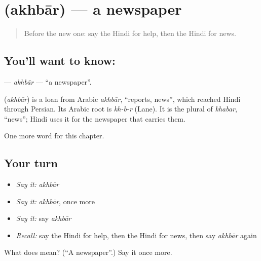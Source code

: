 \section[\texorpdfstring{\hi{अख़बार} (akhbār)}{अख़बार (akhbār)}]{ (akhbār) — a newspaper}

\label{lesson:HI-C190-akhbar}



\begin{quote}
Before the new one: say the Hindi for help, then the Hindi for news.
\end{quote}

\subsection*{You'll want to know: }
\textbf{} — \emph{akhbār} — \textquotedblleft{}a newspaper\textquotedblright{}.

\begin{cousinweb}
\textbf{} (\emph{akhbār}) is a loan from Arabic \emph{akhbār}, \textquotedblleft{}reports, news\textquotedblright{}, which reached Hindi through Persian. Its Arabic root is \emph{kh-b-r} (Lane). It is the plural of \emph{khabar}, \textquotedblleft{}news\textquotedblright{}; Hindi uses it for the newspaper that carries them.
\end{cousinweb}

\begin{grammarlens}[title={What you've built}]
One more word for this chapter.
\end{grammarlens}

\subsection*{Your turn}
\begin{itemize}
\raggedright
  \item \emph{Say it:} \emph{akhbār}
  \item \emph{Say it:} \emph{akhbār}, once more
  \item \emph{Say it:} say \emph{akhbār}
  \item \emph{Recall:} say the Hindi for help, then the Hindi for news, then say \emph{akhbār} again
\end{itemize}

\begin{tcolorbox}[breakable,colback=teal!4,colframe=teal!35!black,title={Before you move on}]
What does  mean? (\textquotedblleft{}A newspaper\textquotedblright{}.) Say it once more.
\end{tcolorbox}
